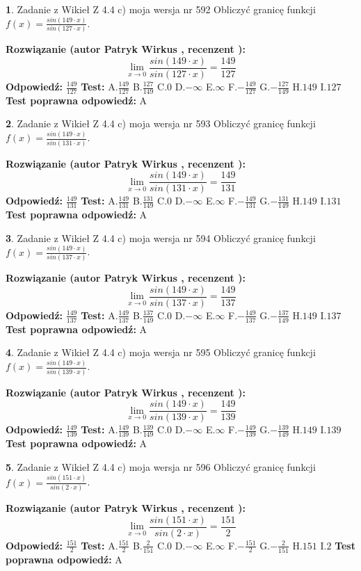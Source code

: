 \documentclass[12pt, a4paper]{article}
\theoremstyle{definition} %
\newtheorem{zad}{}
\newcommand{\zadStart}[1]{\begin{zad}#1\newline}
\newcommand{\zadStop}{\end{zad}}
\newcommand{\rozwStart}[2]{\noindent \textbf{Rozwiązanie (autor #1 , recenzent #2): }\newline}
\newcommand{\rozwStop}{\newline}
\newcommand{\odpStart}{\noindent \textbf{Odpowiedź:}\newline}
\newcommand{\odpStop}{\newline}
\newcommand{\testStart}{\noindent \textbf{Test:}\newline}
\newcommand{\testStop}{\newline}
\newcommand{\kluczStart}{\noindent \textbf{Test poprawna odpowiedź:}\newline}
\newcommand{\kluczStop}{\newline}
\begin{document}
\zadStart{Zadanie z Wikieł Z 4.4 c) moja wersja nr 592}
Obliczyć granicę funkcji $f(x)=\frac{sin(149\cdot x)}{sin(127\cdot x)}$.
\zadStop
\rozwStart{Patryk Wirkus}{}
$$\lim\limits_{x\to 0}\frac{sin(149\cdot x)}{sin(127\cdot x)}=
\frac{149}{127}$$
\rozwStop
\odpStart
$\frac{149}{127}$
\odpStop
\testStart
A.$\frac{149}{127}$
B.$\frac{127}{149}$
C.$0$
D.$-\infty$
E.$\infty$
F.$-\frac{149}{127}$
G.$-\frac{127}{149}$
H.$149$
I.$127$
\testStop
\kluczStart
A
\kluczStop



\zadStart{Zadanie z Wikieł Z 4.4 c) moja wersja nr 593}
Obliczyć granicę funkcji $f(x)=\frac{sin(149\cdot x)}{sin(131\cdot x)}$.
\zadStop
\rozwStart{Patryk Wirkus}{}
$$\lim\limits_{x\to 0}\frac{sin(149\cdot x)}{sin(131\cdot x)}=
\frac{149}{131}$$
\rozwStop
\odpStart
$\frac{149}{131}$
\odpStop
\testStart
A.$\frac{149}{131}$
B.$\frac{131}{149}$
C.$0$
D.$-\infty$
E.$\infty$
F.$-\frac{149}{131}$
G.$-\frac{131}{149}$
H.$149$
I.$131$
\testStop
\kluczStart
A
\kluczStop



\zadStart{Zadanie z Wikieł Z 4.4 c) moja wersja nr 594}
Obliczyć granicę funkcji $f(x)=\frac{sin(149\cdot x)}{sin(137\cdot x)}$.
\zadStop
\rozwStart{Patryk Wirkus}{}
$$\lim\limits_{x\to 0}\frac{sin(149\cdot x)}{sin(137\cdot x)}=
\frac{149}{137}$$
\rozwStop
\odpStart
$\frac{149}{137}$
\odpStop
\testStart
A.$\frac{149}{137}$
B.$\frac{137}{149}$
C.$0$
D.$-\infty$
E.$\infty$
F.$-\frac{149}{137}$
G.$-\frac{137}{149}$
H.$149$
I.$137$
\testStop
\kluczStart
A
\kluczStop



\zadStart{Zadanie z Wikieł Z 4.4 c) moja wersja nr 595}
Obliczyć granicę funkcji $f(x)=\frac{sin(149\cdot x)}{sin(139\cdot x)}$.
\zadStop
\rozwStart{Patryk Wirkus}{}
$$\lim\limits_{x\to 0}\frac{sin(149\cdot x)}{sin(139\cdot x)}=
\frac{149}{139}$$
\rozwStop
\odpStart
$\frac{149}{139}$
\odpStop
\testStart
A.$\frac{149}{139}$
B.$\frac{139}{149}$
C.$0$
D.$-\infty$
E.$\infty$
F.$-\frac{149}{139}$
G.$-\frac{139}{149}$
H.$149$
I.$139$
\testStop
\kluczStart
A
\kluczStop



\zadStart{Zadanie z Wikieł Z 4.4 c) moja wersja nr 596}
Obliczyć granicę funkcji $f(x)=\frac{sin(151\cdot x)}{sin(2\cdot x)}$.
\zadStop
\rozwStart{Patryk Wirkus}{}
$$\lim\limits_{x\to 0}\frac{sin(151\cdot x)}{sin(2\cdot x)}=
\frac{151}{2}$$
\rozwStop
\odpStart
$\frac{151}{2}$
\odpStop
\testStart
A.$\frac{151}{2}$
B.$\frac{2}{151}$
C.$0$
D.$-\infty$
E.$\infty$
F.$-\frac{151}{2}$
G.$-\frac{2}{151}$
H.$151$
I.$2$
\testStop
\kluczStart
A
\kluczStop
\end{document}
